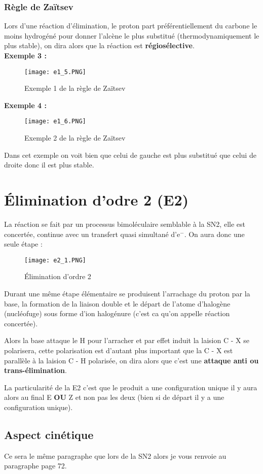 \documentclass[a4paper, oneside]{book}
\begin{document}
\subsubsection{Règle de Zaïtsev}
Lors d'une réaction d'élimination, le proton part préférentiellement du carbone le moins hydrogéné pour donner l'alcène le plus substitué (thermodynamiquement le plus stable), on dira alors que la réaction est \textbf{régiosélective}.\\
\textbf{Exemple 3 :}
\begin{figure}[!h]
    \centering
    \texttt{[image: e1\_5.PNG]}
    \caption{Exemple 1 de la règle de Zaïtsev}
    \label{fig:my_label}
\end{figure}
\newpage
\textbf{Exemple 4 :}
\begin{figure}[!h]
    \centering
    \texttt{[image: e1\_6.PNG]}
    \caption{Exemple 2 de la règle de Zaïtsev}
    \label{fig:my_label}
\end{figure}

Dans cet exemple on voit bien que celui de gauche est plus substitué que celui de droite donc il est plus stable.
\section{\'Elimination d'odre 2 (E2)}
La réaction se fait par un processus bimoléculaire semblable à la SN2, elle est concertée, continue avec un transfert quasi simultané d'e$^-$. On aura donc une seule étape :
\begin{figure}[!h]
    \centering
    \texttt{[image: e2\_1.PNG]}
    \caption{\'Elimination d'ordre 2}
    \label{fig:my_label}
\end{figure}
\newpage
Durant une même étape élémentaire se produisent l'arrachage du proton par la base, la formation de la liaison double et le départ de l'atome d'halogène (nucléofuge) sous forme d'ion halogénure (c'est ca qu'on appelle réaction concertée).

Alors la base attaque le H pour l'arracher et par effet induit la laision C - X se polarisera, cette polarisation est d'autant plus important que la C - X est parallèle à la laision C - H polarisée, on dira alors que c'est une \textbf{attaque anti ou trans-élimination}.

La particularité de la E2 c'est que le produit a une configuration unique il y aura alors au final E \textbf{OU} Z et non pas les deux (bien si de départ il y a une configuration unique).
\subsection{Aspect cinétique}
Ce sera le même paragraphe que lors de la SN2 alors je vous renvoie au paragraphe page 72.
\end{document}

